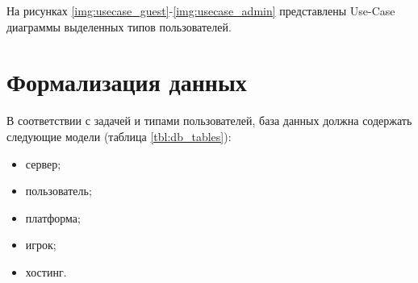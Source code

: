 На рисунках \ref{img:usecase_guest}-\ref{img:usecase_admin} представлены Use-Case диаграммы выделенных типов пользователей.



\section{Формализация данных}

В соответствии с задачей и типами пользователей, база данных должна содержать следующие модели (таблица \ref{tbl:db_tables}):

\begin{itemize}
    \item сервер;
    \item пользователь;
    \item платформа;
    \item игрок;
    \item хостинг.
\end{itemize}

